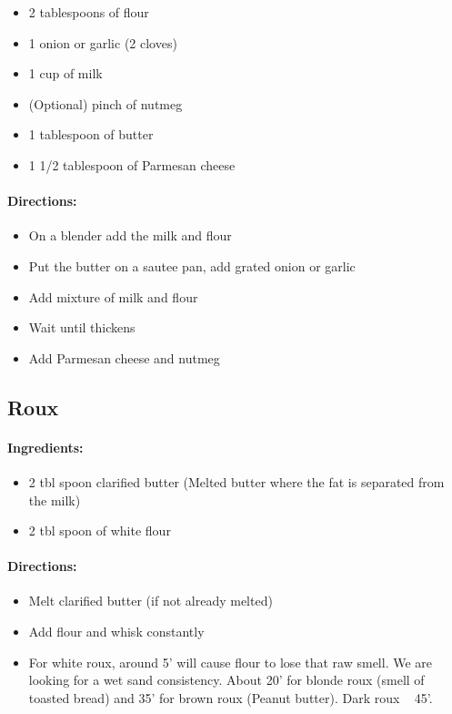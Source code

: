 \documentclass{article}
\begin{document}
\begin{itemize}
	\item 2 tablespoons of flour
	\item 1 onion or garlic (2 cloves)
	\item 1 cup of milk
	\item (Optional) pinch of nutmeg
	\item 1 tablespoon of butter
	\item 1 1/2 tablespoon of Parmesan cheese
\end{itemize}

\paragraph{Directions:}
\begin{itemize}
	\item On a blender add the milk and flour
	\item Put the butter on a sautee pan, add grated onion or garlic
	\item Add mixture of milk and flour
	\item Wait until thickens
	\item Add Parmesan cheese and nutmeg
\end{itemize}

\subsection{Roux}

\paragraph{Ingredients:}

\begin{itemize}
	\item 2 tbl spoon clarified butter (Melted butter where the fat is separated from the milk)
	\item 2 tbl spoon of white flour
\end{itemize}

\paragraph{Directions:}
\begin{itemize}
	\item Melt clarified butter (if not already melted)
	\item Add flour and whisk constantly
	\item For white roux, around 5' will cause flour to lose that raw smell. We are looking for a wet sand consistency. About 20' for blonde roux (smell of toasted bread) and 35' for brown roux (Peanut butter). Dark roux ~ 45'.
\end{itemize}
\end{document}
